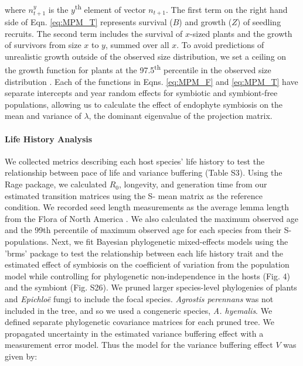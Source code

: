 \documentclass[12pt]{article}
\begin{document}
where $n^y_{t+1}$ is the $y$\textsuperscript{th} element of vector \textbf{$n_{t+1}$}.
The first term on the right hand side of Eqn. \ref{eq:MPM_T} represents survival ($B$) and growth ($Z$) of seedling recruits. 
The second term includes the survival of $x$-sized plants and the growth of survivors from size $x$ to $y$, summed over all $x$. 
To avoid predictions of unrealistic growth outside of the observed size distribution, we set a ceiling on the growth function for plants at the 97.5\textsuperscript{th} percentile in the observed size distribution \cite{williams2012avoiding}.
Each of the functions in Eqns. \ref{eq:MPM_F} and \ref{eq:MPM_T} have separate intercepts and year random effects for symbiotic and symbiont-free populations, allowing us to calculate the effect of endophyte symbiosis on the mean and variance of $\lambda$, the dominant eigenvalue of the projection matrix.

\paragraph*{Life History Analysis}
We collected metrics describing each host species' life history to test the relationship between pace of life and variance buffering (Table S3). 
Using the Rage package, we calculated $R_0$, longevity, and generation time from our estimated transition matrices using the S- mean matrix as the reference condition.
We recorded seed length measurements as the average lemma length from the Flora of North America \cite{FloraNAonline}. 
We also calculated the maximum observed age and the 99th percentile of maximum observed age for each species from their S- populations.
Next, we fit Bayesian phylogenetic mixed-effects models using the 'brms' package \cite{Burkner2017brms} to test the relationship between each life history trait and the estimated effect of symbiosis on the coefficient of variation from the population model while controlling for phylogenetic non-independence in the hosts (Fig. 4) and the symbiont (Fig. S26).
We pruned larger species-level phylogenies of plants\cite{zanne2014three} and \emph{Epichlo\"{e}} fungi \cite{leuchtmann2014nomenclatural} to include the focal species.
\emph{Agrostis perennans} was not included in the tree, and so we used a congeneric species, \emph{A. hyemalis}. 
We defined separate phylogenetic covariance matrices for each pruned tree.
We propagated uncertainty in the estimated variance buffering effect with a measurement error model.
Thus the model for the variance buffering effect $V$ was given by:
\end{document}
